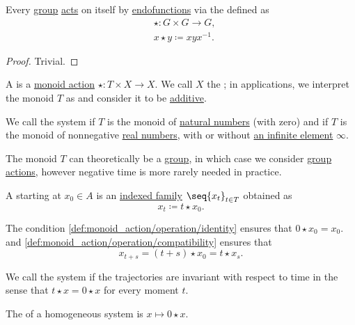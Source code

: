 \begin{proposition}\label{thm:group_conjugation_action}
  Every \hyperref[def:group]{group} \hyperref[def:group_action]{acts} on itself by \hyperref[def:multi_valued_function/endofunction]{endofunctions} via the  defined as
  \begin{equation*}
    \begin{aligned}
      &\star: G \times G \to G, \\
      &x \star y \coloneqq x y x^{-1}.
    \end{aligned}
  \end{equation*}
\end{proposition}
\begin{proof}
  Trivial.
\end{proof}

\begin{definition}\label{def:dynamical_system}\mimprovised
  A  is a \hyperref[def:monoid_action]{monoid action} \( \star: T \times X \to X \). We call \( X \) the ; in applications, we interpret the monoid \( T \) as  and consider it to be \hyperref[rem:additive_magma]{additive}.

  We call the system  if \( T \) is the monoid of \hyperref[def:set_of_natural_numbers]{natural numbers} (with zero) and  if \( T \) is the monoid of nonnegative \hyperref[def:set_of_real_numbers]{real numbers}, with or without \hyperref[def:extended_real_numbers]{an infinite element} \( \infty \).

  The monoid \( T \) can theoretically be a \hyperref[def:group]{group}, in which case we consider \hyperref[def:group_action]{group actions}, however negative time is more rarely needed in practice.

  \begin{thmenum}
     A  starting at  \( x_0 \in A \) is an \hyperref[def:cartesian_product/indexed_family]{indexed family} \( \seq{ x_t }_{t \in T} \) obtained as
    \begin{equation*}
      x_t \coloneqq t \star x_0.
    \end{equation*}

    The condition \ref{def:monoid_action/operation/identity} ensures that \( 0 \star x_0 = x_0 \). and \ref{def:monoid_action/operation/compatibility} ensures that
    \begin{equation*}
      x_{t + s}
      =
      (t + s) \star x_0
      =
      t \star x_s.
    \end{equation*}

     We call the system  if the trajectories are invariant with respect to time in the sense that \( t \star x = 0 \star x \) for every moment \( t \).

    The  of a homogeneous system is \( x \mapsto 0 \star x \).
  \end{thmenum}
\end{definition}
